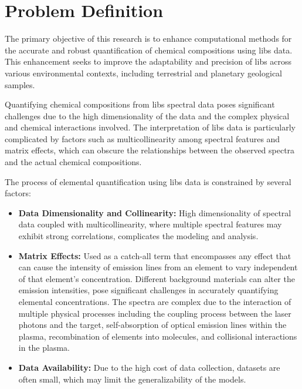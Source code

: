 \section{Problem Definition}\label{sec:problem_definition}
The primary objective of this research is to enhance computational methods for the accurate and robust quantification of chemical compositions using \gls{libs} data.
This enhancement seeks to improve the adaptability and precision of \gls{libs} across various environmental contexts, including terrestrial and planetary geological samples.

Quantifying chemical compositions from \gls{libs} spectral data poses significant challenges due to the high dimensionality of the data and the complex physical and chemical interactions involved. The interpretation of \gls{libs} data is particularly complicated by factors such as multicollinearity among spectral features and matrix effects, which can obscure the relationships between the observed spectra and the actual chemical compositions.

The process of elemental quantification using \gls{libs} data is constrained by several factors:
\begin{itemize}
    \item \textbf{Data Dimensionality and Collinearity:} High dimensionality of spectral data coupled with multicollinearity, where multiple spectral features may exhibit strong correlations, complicates the modeling and analysis\cite{andersonImprovedAccuracyQuantitative2017}.
    \item \textbf{Matrix Effects:} Used as a catch-all term that encompasses any effect that can cause the intensity of emission lines from an element to vary independent of that element's concentration. Different background materials can alter the emission intensities, pose significant challenges in accurately quantifying elemental concentrations. The spectra are complex due to the interaction of multiple physical processes including the coupling process between the laser photons and the target, self-absorption of optical emission lines within the plasma, recombination of elements into molecules, and collisional interactions in the plasma\cite{cleggRecalibrationMarsScience2017, andersonImprovedAccuracyQuantitative2017}.
    \item \textbf{Data Availability:} Due to the high cost of data collection, datasets are often small, which may limit the generalizability of the models\cite{p9_paper}.
\end{itemize}

